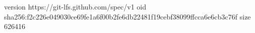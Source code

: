 version https://git-lfs.github.com/spec/v1
oid sha256:f2c226e049030ce69fe1a6f00b2fe6db22481f19cebf38099ffcca6e6cb3c76f
size 626416
